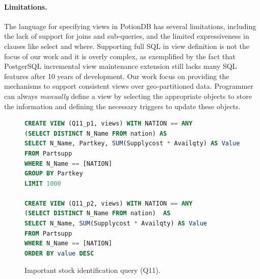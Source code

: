 \documentclass[sigplan,twocolumn,review,anonymous]{acmart}
\begin{document}
\paragraph{Limitations.} 
The language for specifying views in PotionDB has several limitations, including the 
lack of support for joins and sub-queries, and the limited expressiveness in clauses like select and where. 
Supporting full SQL in view definition is not the focus of our work and it is overly complex, as exemplified by the fact that PostgerSQL incremental view 
maintenance extension \cite{ivm} still lacks many SQL features after 10 years of development. 
Our work focus on providing the mechanisms to support consistent views over geo-partitioned data. 
Programmer can always \emph{manually} define a view by selecting the appropriate objects to store the information and 
defining the necessary triggers to update these objects.

%

\begin{figure}[t]
	\begin{lstlisting}[language=SQL]
CREATE VIEW (Q11_p1, views) WITH NATION == ANY 
(SELECT DISTINCT N_Name FROM nation) AS
SELECT N_Name, Partkey, SUM(Supplycost * Availqty) AS Value
FROM Partsupp
WHERE N_Name == [NATION]
GROUP BY Partkey
LIMIT 1000

CREATE VIEW (Q11_p2, views) WITH NATION == ANY
(SELECT DISTINCT N_Name FROM nation)  AS
SELECT N_Name, SUM(Supplycost * Availqty) AS Value
FROM Partsupp
WHERE N_Name == [NATION]
ORDER BY value DESC
\end{lstlisting}
\vspace{-10pt}
	\caption{Important stock identification query (Q11). %
	}
	\vspace{-10pt}
	\label{fig:q11_view}
\end{figure}
\end{document}
